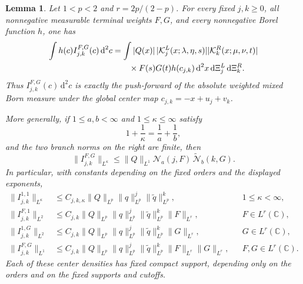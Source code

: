 \documentclass[a4paper,11pt]{article}
\newcommand{\C}{\mathbb{C}}
\newcommand{\dd}{\,\text{d}}
\theoremstyle{plain}
\newtheorem{lem}[thm]{Lemma}
\theoremstyle{definition}
\theoremstyle{remark}
\begin{document}
\begin{lem}
\label{lem-mixed-center-densities}
Let $1<p<2$ and $r=2p/(2-p)$.  For every fixed $j,k\ge0$, all
nonnegative measurable terminal weights $F,G$, and every nonnegative Borel
function $h$, one has
\begin{align}
 \int h(c)I_{j,k}^{F,G}(c)\dd^2c
 &=\int |Q(x)|\,
       |\mathcal K_j^L(x;\lambda,\eta,s)|
       |\mathcal K_k^R(x;\mu,\nu,t)| \notag\\
 &\qquad\times F(s)G(t)h(c_{j,k})
       \dd^2x\dd\Xi_j^L\dd\Xi_k^R .
 \label{exact-mixed-center-pushforward}
\end{align}
Thus $I_{j,k}^{F,G}(c)\dd^2c$ is exactly the push-forward of the
absolute weighted mixed Born measure under the global center map
$c_{j,k}=-x+u_j+v_k$.

More generally, if $1\le a,b<\infty$ and $1\le \kappa\le\infty$ satisfy
\begin{equation}\label{mixed-young-exponents}
        1+\frac1\kappa=\frac1a+\frac1b,
\end{equation}
and the two branch norms on the right are finite, then
\begin{equation}\label{mixed-center-general-young}
 \|I_{j,k}^{F,G}\|_{L^\kappa}
 \le \|Q\|_{L^1}
      \mathcal N_a(j,F)\,
      \widetilde{\mathcal N}_b(k,G).
\end{equation}
In particular, with constants depending on the fixed orders and the displayed
exponents,
\begin{align}
 \|I_{j,k}^{1,1}\|_{L^\kappa}
 &\le C_{j,k,\kappa}\|Q\|_{L^p}
       \|q\|_{L^p}^j\|\widetilde q\|_{L^p}^k,
 &&1\le \kappa<\infty,                                      
 \label{mixed-center-unweighted-Lt}\\
 \|I_{j,k}^{F,1}\|_{L^2}
 &\le C_{j,k}\|Q\|_{L^p}
       \|q\|_{L^p}^j\|\widetilde q\|_{L^p}^k
       \|F\|_{L^r},
 &&F\in L^r(\C),                                      
 \label{mixed-center-left-weighted-L2}\\
 \|I_{j,k}^{1,G}\|_{L^2}
 &\le C_{j,k}\|Q\|_{L^p}
       \|q\|_{L^p}^j\|\widetilde q\|_{L^p}^k
       \|G\|_{L^r},
 &&G\in L^r(\C),                                      
 \label{mixed-center-right-weighted-L2}\\
 \|I_{j,k}^{F,G}\|_{L^1}
 &\le C_{j,k}\|Q\|_{L^p}
       \|q\|_{L^p}^j\|\widetilde q\|_{L^p}^k
       \|F\|_{L^r}\|G\|_{L^r},
 &&F,G\in L^r(\C).                                   
 \label{mixed-center-two-weighted-L1}
\end{align}
Each of these center densities has fixed compact support, depending only on the
orders and on the fixed supports and cutoffs.
\end{lem}
\end{document}
